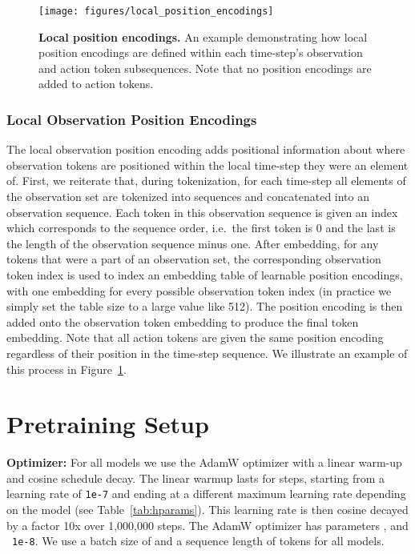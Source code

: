 \documentclass[10pt]{article} \usepackage[accepted]{tmlr}
\begin{document}
\begin{figure}[t]
    \centering
    \texttt{[image: figures/local\_position\_encodings]} 
    \caption{
    {\bf Local position encodings.}
    An example demonstrating how local position encodings are defined within each time-step's observation and action token subsequences. Note that no position encodings are added to action tokens.
    \small}
    \label{fig:local_pos_encs}
\end{figure}

\subsubsection*{Local Observation Position Encodings}

The local observation position encoding adds positional information about where observation tokens are positioned within the local time-step they were an element of. First, we reiterate that, during tokenization, for each time-step all elements of the observation set are tokenized into sequences and concatenated into an observation sequence. Each token in this observation sequence is given an index which corresponds to the sequence order, i.e.\ the first token is 0 and the last is the length of the observation sequence minus one. After embedding, for any tokens that were a part of an observation set, the corresponding observation token index is used to index an embedding table of learnable position encodings, with one embedding for every possible observation token index (in practice we simply set the table size to a large value like 512). The position encoding is then added onto the observation token embedding to produce the final token embedding. Note that all action tokens are given the same position encoding regardless of their position in the time-step sequence. We illustrate an example of this process in Figure~\ref{fig:local_pos_encs}.


\section{Pretraining Setup} 
\label{sec:pretraining_setup}

\noindent \textbf{Optimizer: }
For all models we use the AdamW \citep{loshchilov2019adamw} optimizer with a linear warm-up and cosine schedule decay. The linear warmup lasts for  steps, starting from a learning rate of \texttt{1e-7} and ending at a different maximum learning rate depending on the model (see Table~\ref{tab:hparams}). 
This learning rate is then cosine decayed by a factor 10x over 1,000,000 steps.
The AdamW optimizer has parameters ,  and ~\texttt{1e-8}. We use a batch size of  and a sequence length of  tokens for all models.
\end{document}

